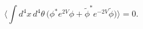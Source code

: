 \begin{equation}\label{Incorrect_Konishi}
\Big\langle \int d^4x\,d^4\theta\,\Big(\phi^* e^{2V}\phi
+ \tilde\phi^* e^{-2V}\tilde\phi\Big)\Big\rangle = 0.
\end{equation}


